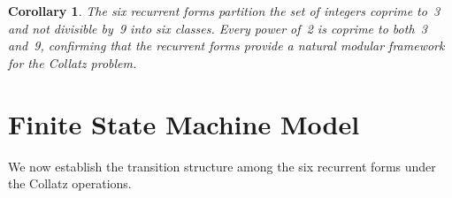 \documentclass[11pt,a4paper]{article}
\theoremstyle{plain}
\newtheorem{corollary}[theorem]{Corollary}
\theoremstyle{definition}
\begin{document}
\begin{corollary}\label{cor:coprime9}
  The six recurrent forms partition the set of integers coprime to~3 and not divisible by~9 into six classes. Every power of~2 is coprime to both~3 and~9, confirming that the recurrent forms provide a natural modular framework for the Collatz problem.
\end{corollary}

\section{Finite State Machine Model}
\label{sec:fsm}

We now establish the transition structure among the six recurrent forms under the Collatz operations.
\end{document}
